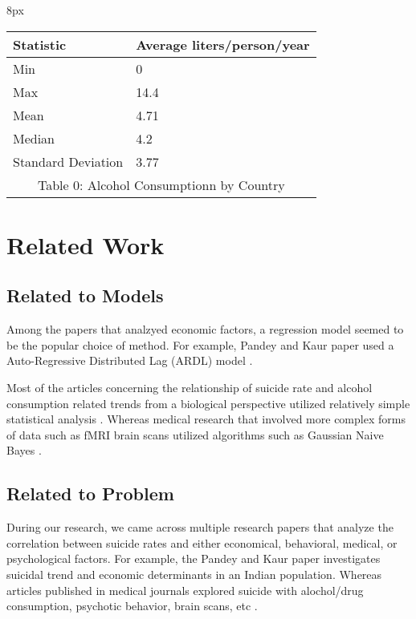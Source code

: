 \documentclass{article}
\begin{document}
\begin{multicols}{2}
\begin{adjustwidth}{8px}{}
\begin{tabular}{|l|l|}
\hline
Statistic          & Average liters/person/year \\ \hline
Min                & 0                          \\ \hline
Max                & 14.4                       \\ \hline
Mean               & 4.71                       \\ \hline
Median             & 4.2                        \\ \hline
Standard Deviation & 3.77                       \\ \hline
\multicolumn{2}{c}{Table 0: Alcohol Consumptionn by Country} 
\label{summary-statistic-table-alcohol}
\end{tabular}
\end{adjustwidth}


\section{Related Work}
\subsection{Related to Models} 

Among the papers that analzyed economic factors, a regression model seemed to be the popular choice of method. For example, Pandey and Kaur paper used a Auto-Regressive Distributed Lag (ARDL) model . 

Most of the articles concerning the relationship of suicide rate and alcohol consumption related trends from a biological perspective utilized relatively simple statistical analysis . Whereas medical research that involved more complex forms of data such as fMRI brain scans utilized algorithms such as Gaussian Naive Bayes .

\subsection{Related to Problem} 

During our research, we came across multiple research papers that analyze the correlation between suicide rates and either economical, behavioral, medical, or psychological factors. For example, the Pandey and Kaur paper investigates suicidal trend and economic determinants in an Indian population. Whereas articles published in medical journals explored suicide with alochol/drug consumption, psychotic behavior, brain scans, etc . 


\end{multicols}
\end{document}
